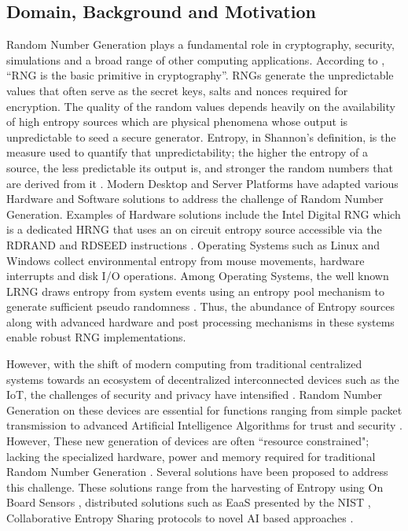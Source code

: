 \documentclass[a4paper, 12pt]{article}
\begin{document}
\subsection{Domain, Background and Motivation}
Random Number Generation plays a fundamental role in cryptography, security, simulations and a broad range of other computing applications. According to \citet{lv2020entropy}, “\ac{RNG} is the basic primitive in cryptography”. \ac{RNG}s generate the unpredictable values that often serve as the secret keys, salts and nonces required for encryption. The quality of the random values depends heavily on the availability of high entropy sources which are physical phenomena whose output is unpredictable to seed a secure generator. Entropy, in Shannon's definition, is the measure used to quantify that unpredictability; the higher the entropy of a source, the less predictable its output is, and stronger the random numbers that are derived from it \citep{shannon1948}. Modern Desktop and Server Platforms have adapted various Hardware and Software solutions to address the challenge of Random Number Generation. Examples of Hardware solutions include the Intel Digital \ac{RNG} which is a dedicated \ac{HRNG} that uses an on circuit entropy source accessible via the RDRAND and RDSEED instructions \citep{intel_drng}. Operating Systems such as Linux and Windows collect environmental entropy from mouse movements, hardware interrupts and disk I/O operations. Among Operating Systems, the well known \ac{LRNG} draws entropy from system events using an entropy pool mechanism to generate sufficient pseudo randomness \citep{gutterman}. Thus, the abundance of Entropy sources along with advanced hardware and post processing mechanisms in these systems enable robust \ac{RNG} implementations.

However, with the shift of modern computing from traditional centralized systems towards an ecosystem of decentralized interconnected devices such as the \ac{IoT}, the challenges of security and privacy have intensified \citep{roman2013iot}. Random Number Generation on these devices are essential for functions ranging from simple packet transmission to advanced Artificial Intelligence Algorithms for trust and security \citep{kietzmann2020prng}. However, These new generation of devices are often ``resource constrained"; lacking the specialized hardware, power and memory required for traditional Random Number Generation \citep{Pawlowski2015Entropy}. Several solutions have been proposed to address this challenge. These solutions range from the harvesting of Entropy using On Board Sensors \citep{Pawlowski2015Entropy}\citep{hennebert2021entropy}, distributed solutions such as \ac{EaaS} presented by the \ac{NIST} \citep{NIST_EaaS}, Collaborative Entropy Sharing protocols \citep{wallace2018} to novel AI based approaches \citep{TRIM_RNG}.
\end{document}
